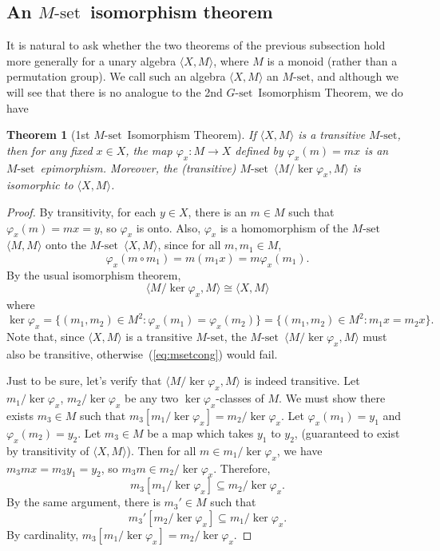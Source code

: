 \documentclass[cm,dissertation,actual,final]{uhthesis}
\theoremstyle{plain}
\newtheorem{theorem}{Theorem}[section]
\theoremstyle{definition}
\theoremstyle{remark}
\numberwithin{theorem}{section}
\numberwithin{claim}{chapter}
\numberwithin{equation}{section}
\numberwithin{conjecture}{chapter}
\newcommand{\<}{\ensuremath{\langle}}
\renewcommand{\>}{\ensuremath{\rangle}}
\newcommand{\0}{\ensuremath{\mathbf{0}}}
\newcommand{\1}{\ensuremath{\mathbf{1}}}
\newcommand{\2}{\ensuremath{\mathbf{2}}}
\newcommand{\3}{\ensuremath{\mathbf{3}}}
\newcommand{\4}{\ensuremath{\mathbf{4}}}
\newcommand{\5}{\ensuremath{\mathbf{5}}}
\newcommand{\Gset}{\ensuremath{G\text{-set}}}
\newcommand{\Mset}{\ensuremath{M\text{-set}}}
\begin{document}
  \subsection{An \Mset\ isomorphism theorem}
  It is natural to ask whether the two theorems of the previous subsection hold
  more generally for a unary algebra $\<X, M\>$, where $M$ is a monoid (rather
  than a permutation group).  We call such an algebra $\<X, M\>$ an \Mset, and
  although we will see that there is no analogue to the 2nd \Gset\ Isomorphism
  Theorem, we do have 
  \begin{theorem}[1st \Mset\ Isomorphism Theorem]
    If $\<X, M\>$ is a transitive \Mset, then for any fixed
    $x\in X$, the map $\varphi_x : M \rightarrow X$ defined by $\varphi_x(m) = mx$
    is an \Mset\ epimorphism. 
    Moreover, the (transitive) \Mset\ $\<M/\ker \varphi_x, M\>$ is isomorphic to 
    $\<X, M\>$.
  \end{theorem}
  \begin{proof}
    By transitivity, for each $y\in X$, there is an $m\in M$ such
    that $\varphi_x(m) = mx = y$, so $\varphi_x$ is onto.  Also, $\varphi_x$ is a
    homomorphism of the \Mset\ $\<M, M\>$ onto
    the \Mset\ $\<X, M\>$, since for all $m, m_1\in M$,
    \[
    \varphi_x(m\circ m_1) = m(m_1 x) = m \varphi_x(m_1).
    \]
    By the usual isomorphism theorem,
    \begin{equation}
      \label{eq:msetcong}
      \<M/\ker \varphi_x, M\> \cong \<X, M\>
    \end{equation}
    where 
    \[
    \ker \varphi_x = \{(m_1, m_2) \in M^2 : \varphi_x(m_1) = \varphi_x(m_2)\} =
    \{(m_1, m_2) \in M^2 : m_1 x = m_2 x \}.
    \]
    Note that, since $\<X, M\>$ is a transitive \Mset, the \Mset\ 
    $\<M/\ker \varphi_x, M\>$ must also be transitive, otherwise~(\ref{eq:msetcong}) would
    fail. 

    Just to be sure, let's verify that $\<M/\ker \varphi_x, M\>$ is indeed transitive.
    Let $m_1/\ker\varphi_x$, $m_2/\ker\varphi_x$ be any two $\ker\varphi_x$-classes
    of $M$.  We must show there exists $m_3\in M$ such that 
    $m_3[m_1/\ker\varphi_x]= m_2/\ker\varphi_x$.
    Let $\varphi_x(m_1) = y_1$ and 
    $\varphi_x(m_2) = y_2$.  Let $m_3\in M$ be a map which takes  $y_1$ to $y_2$,
    (guaranteed to exist by transitivity of $\<X, M\>$).  Then for all 
    $m\in m_1/\ker\varphi_x$, we have %
    $m_3mx = m_3y_1 = y_2$, so $m_3m \in m_2/\ker\varphi_x$.  Therefore, 
    \[
    m_3[m_1/\ker\varphi_x]\subseteq  m_2/\ker\varphi_x.
    \]
    By the same argument, there is $m_3'\in M$ such that 
    \[
    m_3'[m_2/\ker\varphi_x]\subseteq  m_1/\ker\varphi_x.
    \]
    By cardinality, $m_3[m_1/\ker\varphi_x]= m_2/\ker\varphi_x$.
  \end{proof}
\end{document}
